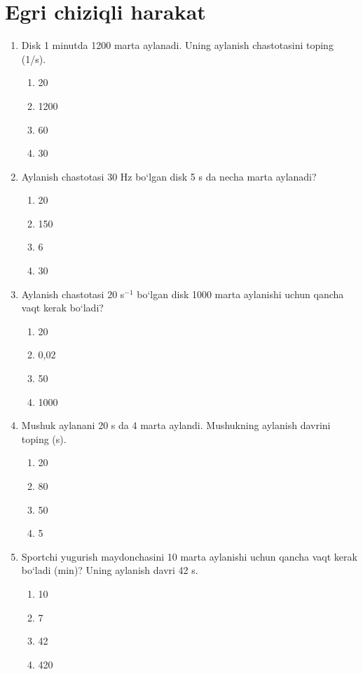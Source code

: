

\section{Egri chiziqli harakat}


\begin{enumerate}

\item Disk 1 minutda 1200 marta aylanadi. Uning aylanish chastotasini toping (1/s).
\begin{enumerate}[label=\Alph*)]
\item 20
\item 1200
\item 60
\item 30
\end{enumerate}

\item Aylanish chastotasi 30 Hz bo‘lgan disk 5 s da necha marta aylanadi?
\begin{enumerate}[label=\Alph*)]
\item 20
\item 150
\item 6
\item 30
\end{enumerate}

\item Aylanish chastotasi 20 s$^{-1}$ bo‘lgan disk 1000 marta aylanishi uchun qancha vaqt kerak bo‘ladi?
\begin{enumerate}[label=\Alph*)]
\item 20
\item 0,02
\item 50
\item 1000
\end{enumerate}

\item Mushuk aylanani 20 s da 4 marta aylandi. Mushukning aylanish davrini toping (s).
\begin{enumerate}[label=\Alph*)]
\item 20
\item 80
\item 50
\item 5
\end{enumerate}

\item Sportchi yugurish maydonchasini 10 marta aylanishi uchun qancha vaqt kerak bo‘ladi (min)? Uning aylanish davri 42 s.
\begin{enumerate}[label=\Alph*)]
\item 10
\item 7
\item 42
\item 420
\end{enumerate}


\end{enumerate}
